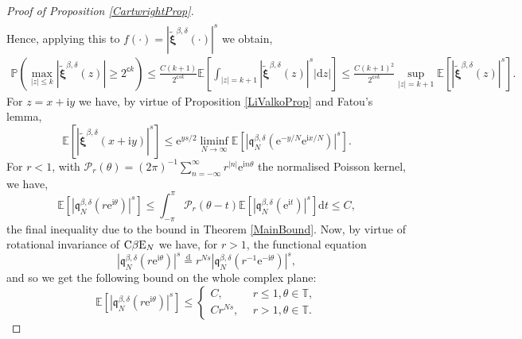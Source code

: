 \documentclass[]{article}
\begin{document}
\begin{proof}[Proof of Proposition \ref{CartwrightProp}]
\begin{align*}
\end{align*}
Hence, applying this to $f(\cdot)=|\tilde{\boldsymbol{\xi}}^{\beta,\delta}(\cdot)|^s$ we obtain,
\begin{align*}
\mathbb{P}\left(\max_{|z|\le k}\left|\tilde{\boldsymbol{\xi}}^{\beta,\delta}(z)\right|\ge 2^{\mathsf{c}k}\right) \le\frac{C(k+1)}{2^{\mathsf{c}sk}}\mathbb{E}\left[\int_{|z|=k+1}\left|\tilde{\boldsymbol{\xi}}^{\beta,\delta}(z)\right|^{s}|\mathrm{d}z|\right]\le\frac{C(k+1)^2}{2^{\mathsf{c}sk}}\sup_{|z|=k+1}\mathbb{E}\left[\left|\tilde{\boldsymbol{\xi}}^{\beta,\delta}(z)\right|^s\right].
\end{align*}
For $z=x+\mathrm{i}y$ we have, by virtue of Proposition \ref{LiValkoProp} and Fatou's lemma,
\begin{equation}\label{BoundXiPlane}
\mathbb{E}\left[\left|\tilde{\boldsymbol{\xi}}^{\beta,\delta}(x+\mathrm{i}y)\right|^s\right] \le \mathrm{e}^{ys/2} \liminf_{N\to \infty}\mathbb{E}\left[\left|\mathfrak{q}_N^{\beta,\delta}(\mathrm{e}^{-y/N}\mathrm{e}^{\mathrm{i}x/N})\right|^s\right].
\end{equation}
For $r<1$, with $\mathcal{P}_r(\theta)=(2\pi)^{-1}\sum_{n=-\infty}^\infty r^{|n|}\mathrm{e}^{\mathrm{i}n\theta}$ the normalised Poisson kernel, we have,
\begin{equation}
\mathbb{E}\left[\left|\mathfrak{q}_N^{\beta,\delta}(r\mathrm{e}^{\mathrm{i}\theta})\right|^s\right]\le \int_{-\pi}^\pi \mathcal{P}_{r}(\theta-t) \mathbb{E}\left[\left|\mathfrak{q}_N^{\beta,\delta}(\mathrm{e}^{\mathrm{i}t})\right|^s\right]\mathrm{d}t\le C,
\end{equation}
the final inequality due to the bound in Theorem \ref{MainBound}.
Now, by virtue of rotational invariance of $\textnormal{C}\beta \textnormal{E}_N$ we have, for $r>1$, the functional equation
\begin{equation*}
\left|\mathfrak{q}_N^{\beta,\delta}(r\mathrm{e}^{\mathrm{i}\theta})\right|^s\overset{\mathrm{d}}{=}r^{Ns}\left|\mathfrak{q}_N^{\beta,\delta}(r^{-1}\mathrm{e}^{-\mathrm{i}\theta})\right|^s,
\end{equation*}
and so we get the following bound on the whole complex plane:
\begin{equation*}
  \mathbb{E}\left[\left|\mathfrak{q}_N^{\beta,\delta}(r\mathrm{e}^{\mathrm{i}\theta})\right|^s\right]  \le \begin{cases}
        C, \ \ &r \le 1, \theta \in \mathbb{T},\\
        C r^{Ns}, \ \ &r> 1, \theta \in \mathbb{T}.
    \end{cases}

\end{equation*}
\end{proof}
\end{document}
